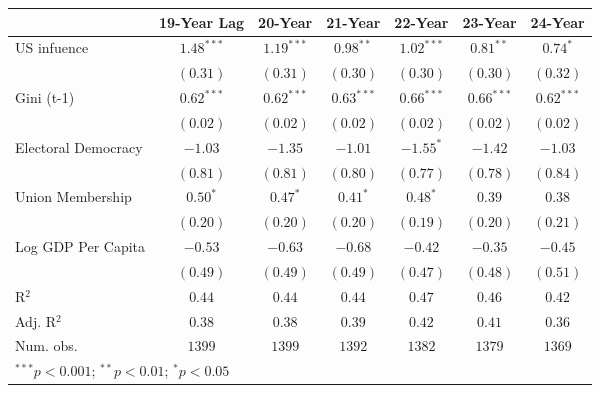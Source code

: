 
\begin{table}
\begin{center}
\begin{tabular}{l c c c c c c}
\toprule
 & 19-Year Lag & 20-Year & 21-Year & 22-Year & 23-Year & 24-Year \\
\midrule
US infuence         & $\mathbf{1.48}^{***}$ & $\mathbf{1.19}^{***}$ & $\mathbf{0.98}^{**}$  & $\mathbf{1.02}^{***}$ & $\mathbf{0.81}^{**}$  & $\mathbf{0.74}^{*}$   \\
                    & $(0.31)$              & $(0.31)$              & $(0.30)$              & $(0.30)$              & $(0.30)$              & $(0.32)$              \\
Gini (t-1)          & $\mathbf{0.62}^{***}$ & $\mathbf{0.62}^{***}$ & $\mathbf{0.63}^{***}$ & $\mathbf{0.66}^{***}$ & $\mathbf{0.66}^{***}$ & $\mathbf{0.62}^{***}$ \\
                    & $(0.02)$              & $(0.02)$              & $(0.02)$              & $(0.02)$              & $(0.02)$              & $(0.02)$              \\
Electoral Democracy & $-1.03$               & $-1.35$               & $-1.01$               & $\mathbf{-1.55}^{*}$  & $-1.42$               & $-1.03$               \\
                    & $(0.81)$              & $(0.81)$              & $(0.80)$              & $(0.77)$              & $(0.78)$              & $(0.84)$              \\
Union Membership    & $\mathbf{0.50}^{*}$   & $\mathbf{0.47}^{*}$   & $\mathbf{0.41}^{*}$   & $\mathbf{0.48}^{*}$   & $0.39$                & $0.38$                \\
                    & $(0.20)$              & $(0.20)$              & $(0.20)$              & $(0.19)$              & $(0.20)$              & $(0.21)$              \\
Log GDP Per Capita  & $-0.53$               & $-0.63$               & $-0.68$               & $-0.42$               & $-0.35$               & $-0.45$               \\
                    & $(0.49)$              & $(0.49)$              & $(0.49)$              & $(0.47)$              & $(0.48)$              & $(0.51)$              \\
\midrule
R$^2$               & $0.44$                & $0.44$                & $0.44$                & $0.47$                & $0.46$                & $0.42$                \\
Adj. R$^2$          & $0.38$                & $0.38$                & $0.39$                & $0.42$                & $0.41$                & $0.36$                \\
Num. obs.           & $1399$                & $1399$                & $1392$                & $1382$                & $1379$                & $1369$                \\
\bottomrule
\multicolumn{7}{l}{\scriptsize{$^{***}p<0.001$; $^{**}p<0.01$; $^{*}p<0.05$}}
\end{tabular}
\label{table:coefficients}
\end{center}
\end{table}
